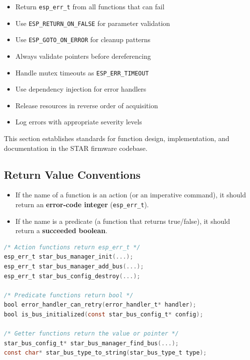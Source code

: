 \begin{itemize}
    \item Return \texttt{esp\_err\_t} from all functions that can fail
    \item Use \texttt{ESP\_RETURN\_ON\_FALSE} for parameter validation
    \item Use \texttt{ESP\_GOTO\_ON\_ERROR} for cleanup patterns
    \item Always validate pointers before dereferencing
    \item Handle mutex timeouts as \texttt{ESP\_ERR\_TIMEOUT}
    \item Use dependency injection for error handlers
    \item Release resources in reverse order of acquisition
    \item Log errors with appropriate severity levels
\end{itemize}



This section establishes standards for function design, implementation, and documentation in the STAR firmware codebase.

\subsection{Return Value Conventions}

\begin{itemize}
    \item If the name of a function is an action (or an imperative command), it should return an \textbf{error-code integer} (\texttt{esp\_err\_t}).
    \item If the name is a predicate (a function that returns true/false), it should return a \textbf{succeeded boolean}.
\end{itemize}

\begin{lstlisting}[language=C]
/* Action functions return esp_err_t */
esp_err_t star_bus_manager_init(...);
esp_err_t star_bus_manager_add_bus(...);
esp_err_t star_bus_config_destroy(...);

/* Predicate functions return bool */
bool error_handler_can_retry(error_handler_t* handler);
bool is_bus_initialized(const star_bus_config_t* config);

/* Getter functions return the value or pointer */
star_bus_config_t* star_bus_manager_find_bus(...);
const char* star_bus_type_to_string(star_bus_type_t type);
\end{lstlisting}

